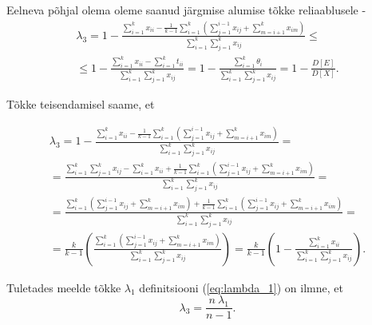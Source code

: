 \documentclass[a4paper,12pt,oneside]{article}
\numberwithin{equation}{section}
\theoremstyle{definition}
\begin{document}
Eelneva põhjal olema oleme saanud järgmise alumise tõkke reliaablusele -  
\begin{gather*}
\lambda_3 = 1 - \frac{\sum \limits_{i=1}^k x_{ii} -  \frac{1}{k - 1} \sum \limits_{i=1}^k  \left( \sum \limits_{j=1}^{i-1} x_{ij} + \sum \limits_{m=i+1}^k {x_{im}} \right)}{\sum \limits_{i=1}^k \sum \limits_{j=1}^k x_{ij}} \leq \\
\leq 1 - \frac{\sum \limits_{i=1}^k x_{ii} - \sum \limits_{i=1}^k  t_{ii}}{\sum \limits_{i=1}^k \sum \limits_{j=1}^k x_{ij}} =   1 - \frac{\sum \limits_{i=1}^k \theta_i}{\sum \limits_{i=1}^k \sum \limits_{j=1}^k x_{ij}} =  1 - \frac{D \left[ E \right]}{D \left[ X \right]} \text{.}
\end{gather*}

Tõkke teisendamisel saame, et

\begin{equation*}
\begin{gathered}
\lambda_3 = 1 - \frac{\sum \limits_{i=1}^k x_{ii} -  \frac{1}{k - 1} \sum \limits_{i=1}^k  \left( \sum \limits_{j=1}^{i-1} x_{ij} + \sum \limits_{m=i+1}^k {x_{im}} \right)}{\sum \limits_{i=1}^k \sum \limits_{j=1}^k x_{ij}} = \\
= \frac{\sum \limits_{i=1}^k \sum \limits_{j=1}^k x_{ij} - \sum \limits_{i=1}^k x_{ii} +  \frac{1}{k - 1} \sum \limits_{i=1}^k  \left( \sum \limits_{j=1}^{i-1} x_{ij} + \sum \limits_{m=i+1}^k {x_{im}} \right)}{\sum \limits_{i=1}^k \sum \limits_{j=1}^k x_{ij}} = \\
= \frac{\sum \limits_{i=1}^k  \left( \sum \limits_{j=1}^{i-1} x_{ij} + \sum \limits_{m=i+1}^k {x_{im}} \right) +  \frac{1}{k - 1} \sum \limits_{i=1}^k  \left( \sum \limits_{j=1}^{i-1} x_{ij} + \sum \limits_{m=i+1}^k {x_{im}} \right)}{\sum \limits_{i=1}^k \sum \limits_{j=1}^k x_{ij}} = \\
= \frac{k}{k-1} \left( \frac{\sum \limits_{i=1}^k  \left( \sum \limits_{j=1}^{i-1} x_{ij} + \sum \limits_{m=i+1}^k {x_{im}} \right) }{\sum \limits_{i=1}^k \sum \limits_{j=1}^k x_{ij}} \right)
= \frac{k}{k-1} \left(1 - \frac{\sum \limits_{i=1}^k x_{ii}}{\sum \limits_{i=1}^k \sum \limits_{j=1}^k x_{ij}} \right).
\end{gathered}
\end{equation*}

Tuletades meelde tõkke $\lambda_1$ definitsiooni (\ref{eq:lambda_1}) on ilmne, et
\begin{equation}
\label{eq:lambda_3_from_lambda_1}
\lambda_3 = \frac{n\ \lambda_1}{n-1}.
\end{equation}
\end{document}
